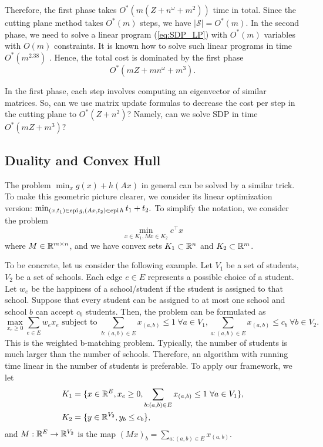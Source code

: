 Therefore, the first phase takes $O^{*}(m(Z+n^{\omega}+m^{2}))$ time
in total. Since the cutting plane method takes $O^{*}(m)$ steps,
we have $|\mathcal{S}|=O^{*}(m)$. In the second phase, we need to
solve a linear program (\ref{eq:SDP_LP}) with $O^{*}(m)$ variables
with $O(m)$ constraints. It is known how to solve such linear programs
in time $O^{*}(m^{2.38})$ \cite{cohen2018solving}. Hence, the total
cost is dominated by the first phase 
\[
O^{*}\left(mZ+mn^{\omega}+m^{3}\right).
\]

\begin{problem}
In the first phase, each step involves computing an eigenvector of
similar matrices. So, can we use matrix update formulas to decrease
the cost per step in the cutting plane to $O^{*}(Z+n^{2})$? Namely,
can we solve SDP in time $O^{*}\left(mZ+m^{3}\right)?$
\end{problem}


\subsection{Duality and Convex Hull}

The problem $\min_{x}g(x)+h(Ax)$ in general can be solved by a similar
trick. To make this geometric picture clearer, we consider its linear
optimization version: $\min_{(x,t_{1})\in\mathrm{epi}\,g,(Ax,t_{2})\in\mathrm{epi}\,h}t_{1}+t_{2}.$
To simplify the notation, we consider the problem
\[
\min_{x\in K_{1},Mx\in K_{2}}c^{\top}x
\]
where $M\in\mathbb{R}^{m\times n}$, and we have convex sets $K_{1}\subset\mathbb{R}^{n}$
and $K_{2}\subset\mathbb{R}^{m}$. 

To be concrete, let us consider the following example. Let $V_{1}$
be a set of students, $V_{2}$ be a set of schools. Each edge $e\in E$
represents a possible choice of a student. Let $w_{e}$ be the happiness
of a school/student if the student is assigned to that school. Suppose
that every student can be assigned to at most one school and school
$b$ can accept $c_{b}$ students. Then, the problem can be formulated
as
\[
\max_{x_{e}\geq0}\sum_{e\in E}w_{e}x_{e}\text{ subject to }\sum_{b:(a,b)\in E}x_{(a,b)}\leq1\ \forall a\in V_{1},\sum_{a:(a,b)\in E}x_{(a,b)}\leq c_{b}\ \forall b\in V_{2}.
\]
This is the weighted b-matching problem. Typically, the number of
students is much larger than the number of schools. Therefore, an
algorithm with running time linear in the number of students is preferable.
To apply our framework, we let
\begin{align*}
K_{1} & =\{x\in\R^{E},x_{e}\geq0,\sum_{b:(a,b)\in E}x_{(a,b)}\leq1\ \forall a\in V_{1}\},\\
K_{2} & =\{y\in\R^{V_{2}},y_{b}\leq c_{b}\},
\end{align*}
and $M:\mathbb{R}^{E}\rightarrow\mathbb{R}^{V_{2}}$ is the map $(Mx)_{b}=\sum_{a:(a,b)\in E}x_{(a,b)}.$

